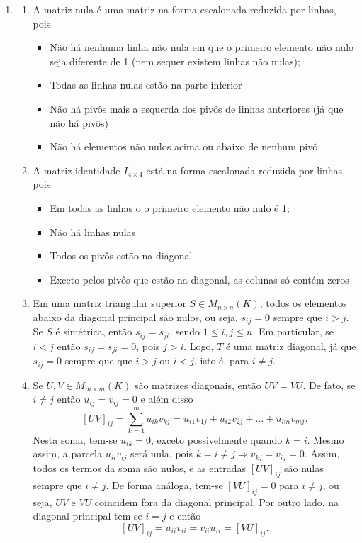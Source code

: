 \documentclass[12pt,a4paper]{article}
\begin{document}
\begin{enumerate}
\item
\begin{enumerate}
\item A matriz nula é uma matriz na forma escalonada reduzida por linhas, pois
\begin{itemize}
\item Não há nenhuma linha não nula em que o primeiro elemento não nulo seja diferente de 1 (nem sequer existem linhas não nulas);
\item Todas as linhas nulas estão na parte inferior
\item Não há pivôs mais a esquerda dos pivôs de linhas anteriores (já que não há pivôs)
\item Não há elementos não nulos acima ou abaixo de nenhum pivô
\end{itemize}
\item A matriz identidade $I_{4 \times 4}$ está na forma escalonada reduzida por linhas pois
\begin{itemize}
\item Em todas as linhas o o primeiro elemento não nulo é 1;
\item Não há linhas nulas
\item Todos os pivôs estão na diagonal
\item Exceto pelos pivôs que estão na diagonal, as colunas só contém zeros
\end{itemize}

\item Em uma matriz triangular superior $S \in M_{n \times n}(K)$, todos os elementos abaixo da diagonal principal são nulos, ou seja, $s_{ij} = 0$ sempre que $i > j$. Se $S$ é simétrica, então $s_{ij} = s_{ji}$, sendo $1 \leq i,j \leq n$. Em particular, se $i < j$ então $s_{ij} = s_{ji} = 0$, pois $j > i$. Logo, $T$ é uma matriz diagonal, já que $s_{ij} = 0$ sempre que que $i > j$ ou $i < j$, isto é, para $i \neq j$.

\item Se $U, V \in M_{m \times m} (K)$ são matrizes diagonais, então $UV = VU$. De fato, se $i \neq j$ então $u_{ij} = v_{ij} = 0$ e além disso
\[
\left[UV\right]_{ij}
= \sum_{k=1}^m u_{ik} v_{kj}
= u_{i1} v_{1j} + u_{i2} v_{2j} + \ldots + u_{im} v_{mj}.
\]
Nesta soma, tem-se $u_{ik} = 0$, exceto possivelmente quando $k = i$. Mesmo assim, a parcela $u_{ii}v_{ij}$ será nula, pois $k = i \neq j \Rightarrow v_{kj} = v_{ij} = 0$. Assim, todos os termos da soma são nulos, e as entradas $\left[UV\right]_{ij}$ são nulas sempre que $i \neq j$. De forma análoga, tem-se $\left[VU\right]_{ij} = 0 $ para $i \neq j$, ou seja, $UV$ e $VU$ coincidem fora da diagonal principal. Por outro lado, na diagonal principal tem-se $i = j$ e então
\[
\left[UV\right]_{ij} = u_{ii} v_{ii} = v_{ii} u_{ii} = \left[VU\right]_{ij}.
\]


\end{enumerate}
\end{enumerate}
\end{document}
